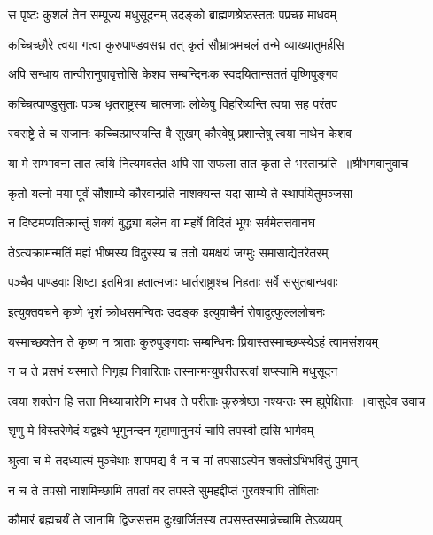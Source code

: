 \twolineshloka
{स पृष्टः कुशलं तेन सम्पूज्य मधुसूदनम्}
{उदङ्को ब्राह्मणश्रेष्ठस्ततः पप्रच्छ माधवम्}


\twolineshloka
{कच्चिच्छौरे त्वया गत्वा कुरुपाण्डवसद्म तत्}
{कृतं सौभ्रात्रमचलं तन्मे व्याख्यातुमर्हसि}


\twolineshloka
{अपि सन्धाय तान्वीरानुपावृत्तोसि केशव}
{सम्बन्दिनःक स्वदयितान्सततं वृष्णिपुङ्गव}


\twolineshloka
{कच्चित्पाण्डुसुताः पञ्च धृतराष्ट्रस्य चात्मजाः}
{लोकेषु विहरिष्यन्ति त्वया सह परंतप}


\twolineshloka
{स्वराष्ट्रे ते च राजानः कच्चित्प्राप्स्यन्ति वै सुखम्}
{कौरवेषु प्रशान्तेषु त्वया नाथेन केशव}


\threelineshloka
{या मे सम्भावना तात त्वयि नित्यमवर्तत}
{अपि सा सफला तात कृता ते भरतान्प्रति ॥श्रीभगवानुवाच}
{}


\threelineshloka
{कृतो यत्नो मया पूर्वं सौशाम्ये कौरवान्प्रति}
{नाशक्यन्त यदा साम्ये ते स्थापयितुमञ्जसा}
{}


\twolineshloka
{न दिष्टमप्यतिक्रान्तुं शक्यं बुद्ध्या बलेन वा}
{महर्षे विदितं भूयः सर्वमेतत्तवानघ}


\twolineshloka
{तेऽत्यक्रामन्मतिं मह्यं भीष्मस्य विदुरस्य च}
{ततो यमक्षयं जग्मुः समासाद्येतरेतरम्}


\twolineshloka
{पञ्चैव पाण्डवाः शिष्टा इतमित्रा हतात्मजाः}
{धार्तराष्ट्राश्च निहताः सर्वे ससुतबान्धवाः}


\twolineshloka
{इत्युक्तवचने कृष्णे भृशं क्रोधसमन्वितः}
{उदङ्क इत्युवाचैनं रोषादुत्फुल्ललोचनः}


\twolineshloka
{यस्माच्छक्तेन ते कृष्ण न त्राताः कुरुपुङ्गवाः}
{सम्बन्धिनः प्रियास्तस्माच्छप्स्येऽहं त्वामसंशयम्}


\twolineshloka
{न च ते प्रसभं यस्मात्ते निगृह्य निवारिताः}
{तस्मान्मन्युपरीतस्त्वां शप्स्यामि मधुसूदन}


\threelineshloka
{त्वया शक्तेन हि सता मिथ्याचारेणि माधव}
{ते परीताः कुरुश्रेष्ठा नश्यन्तः स्म ह्युपेक्षिताः ॥वासुदेव उवाच}
{}


\twolineshloka
{शृणु मे विस्तरेणेदं यद्वक्ष्ये भृगुनन्दन}
{गृहाणानुनयं चापि तपस्वी ह्यसि भार्गवम्}


\twolineshloka
{श्रुत्वा च मे तदध्यात्मं मुञ्चेथाः शापमद्य वै}
{न च मां तपसाऽल्पेन शक्तोऽभिभवितुं पुमान्}


\twolineshloka
{न च ते तपसो नाशमिच्छामि तपतां वर}
{तपस्ते सुमहद्दीप्तं गुरवश्चापि तोषिताः}


\twolineshloka
{कौमारं ब्रह्मचर्यं ते जानामि द्विजसत्तम}
{दुःखार्जितस्य तपसस्तस्मान्नेच्चामि तेऽव्ययम्}


